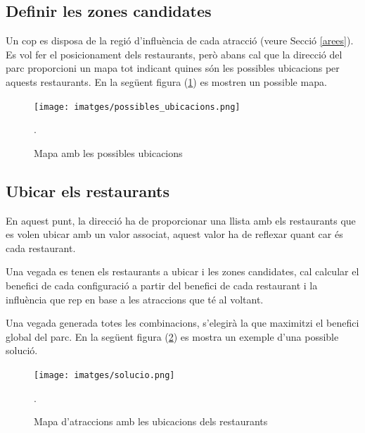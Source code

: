 \documentclass[12pt]{article}
\begin{document}
\subsection{Definir les zones candidates}
Un cop es disposa de la regió d'influència de cada atracció (veure Secció \ref{arees}). Es vol fer el posicionament dels restaurants, però abans cal que la direcció del parc proporcioni un mapa tot indicant quines són les possibles ubicacions per aquests restaurants. En la següent figura (\ref{fig:zones_candidates}) es mostren un possible mapa.

\begin{figure}[H]
	\centering
	\texttt{[image: imatges/possibles\_ubicacions.png]}\par\vspace{1cm}
	\caption{Mapa amb les possibles ubicacions}.
	\label{fig:zones_candidates}
\end{figure}

\subsection{Ubicar els restaurants}
En aquest punt, la direcció ha de proporcionar una llista amb els restaurants que es volen ubicar amb un valor associat, aquest valor ha de reflexar quant car és cada restaurant.

Una vegada es tenen els restaurants a ubicar i les zones candidates, cal calcular el benefici de cada configuració a partir del benefici de cada restaurant i la influència que rep en base a les atraccions que té al voltant.  

Una vegada generada totes les combinacions, s'elegirà la que maximitzi el benefici global del parc. En la següent figura (\ref{fig:mapa_restaurants}) es mostra un exemple d'una possible solució.

\begin{figure}[H]
	\centering
	\texttt{[image: imatges/solucio.png]}\par\vspace{1cm}
	\caption{Mapa d'atraccions amb les ubicacions dels restaurants}.
	\label{fig:mapa_restaurants}
\end{figure}
\end{document}
